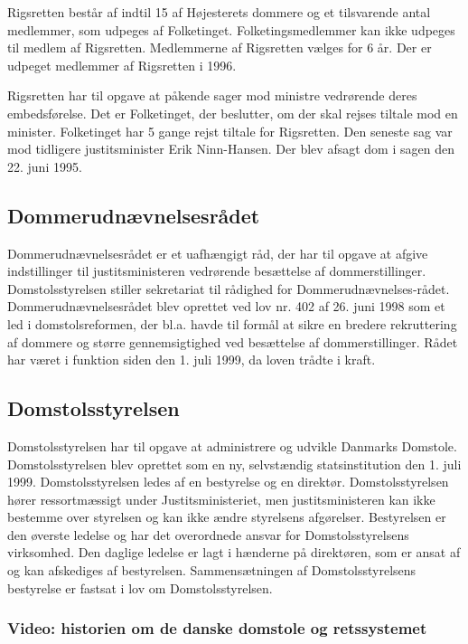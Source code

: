 \documentclass[]{book}
\begin{document}
Rigsretten består af indtil 15 af Højesterets dommere og et tilsvarende antal medlemmer, som udpeges af Folketinget. Folketingsmedlemmer kan ikke udpeges til medlem af Rigsretten.
Medlemmerne af Rigsretten vælges for 6 år. Der er udpeget medlemmer af Rigsretten i 1996.

Rigsretten har til opgave at påkende sager mod ministre vedrørende deres embedsførelse. Det er Folketinget, der beslutter, om der skal rejses tiltale mod en minister.
Folketinget har 5 gange rejst tiltale for Rigsretten. Den seneste sag var mod tidligere justitsminister Erik Ninn-Hansen. Der blev afsagt dom i sagen den 22. juni 1995.

\hypertarget{dommerudnvnelsesradet}{%
\subsection{Dommerudnævnelsesrådet}\label{dommerudnvnelsesradet}}

Dommerudnævnelsesrådet er et uafhængigt råd, der har til opgave at afgive indstillinger til justitsministeren vedrørende besættelse af dommerstillinger.
Domstolsstyrelsen stiller sekretariat til rådighed for Dommerudnævnelses-rådet.
Dommerudnævnelsesrådet blev oprettet ved lov nr. 402 af 26. juni 1998 som et led i domstolsreformen, der bl.a. havde til formål at sikre en bredere rekruttering af dommere og større gennemsigtighed ved besættelse af dommerstillinger. Rådet har været i funktion siden den 1. juli 1999, da loven trådte i kraft.

\hypertarget{domstolsstyrelsen}{%
\subsection{Domstolsstyrelsen}\label{domstolsstyrelsen}}

Domstolsstyrelsen har til opgave at administrere og udvikle Danmarks Domstole.
Domstolsstyrelsen blev oprettet som en ny, selvstændig statsinstitution den 1. juli 1999.
Domstolsstyrelsen ledes af en bestyrelse og en direktør. Domstolsstyrelsen hører ressortmæssigt under Justitsministeriet, men justitsministeren kan ikke bestemme over styrelsen og kan ikke ændre styrelsens afgørelser.
Bestyrelsen er den øverste ledelse og har det overordnede ansvar for Domstolsstyrelsens virksomhed. Den daglige ledelse er lagt i hænderne på direktøren, som er ansat af og kan afskediges af bestyrelsen.
Sammensætningen af Domstolsstyrelsens bestyrelse er fastsat i lov om Domstolsstyrelsen.

\hypertarget{video-historien-om-de-danske-domstole-og-retssystemet}{%
\subsubsection{Video: historien om de danske domstole og retssystemet}\label{video-historien-om-de-danske-domstole-og-retssystemet}}
\end{document}
